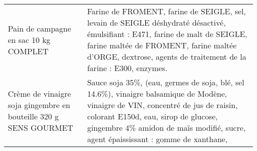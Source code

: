 \begin{longtable}{p{5cm}p{10cm}}
                                                                    Pain de campagne en sac 10 kg COMPLET &                                                                                                                                                                                                                                                                                                                                                                                                                                                                                                                                                                                                                                                                                                                                                                                              Farine de FROMENT, farine de SEIGLE, sel, levain de SEIGLE déshydraté désactivé, émulsifiant : E471, farine de malt de SEIGLE, farine maltée de FROMENT, farine maltée d'ORGE, dextrose, agents de traitement de la farine : E300, enzymes. \\
                                         Crème de vinaigre soja gingembre en bouteille 320 g SENS GOURMET &                                                                                                                                                                                                                                                                                                                                                                                                                                                                                                                                                                                                                                                                                                                                                                            Sauce soja 35\%, (eau, germes de soja, blé, sel 14.6\%), vinaigre balsamique de Modène, vinaigre de VIN, concentré de jus de raisin, colorant E150d, eau, sirop de glucose, gingembre 4\% amidon de maïs modifié, sucre, agent épaississant : gomme de xanthane, \\

\end{longtable}
